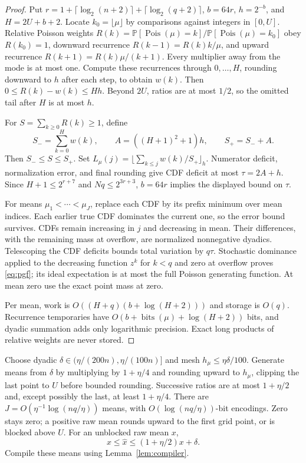 \documentclass[acmsmall,11pt,screen,nonacm]{acmart}
\newcommand{\Pois}{\operatorname{Pois}}
\newcommand{\Prb}{\mathbb{P}}
\newcommand{\floorg}[2]{\lfloor #1\rfloor_{#2}}
\begin{document}
\begin{proof}
Put $r=1+\lceil\log_2(n+2)\rceil+\lceil\log_2(q+2)\rceil$, $b=64r$, $h=2^{-b}$, and $H=2U+b+2$. Locate $k_0=\lfloor\mu\rfloor$ by comparisons against integers in $[0,U]$. Relative Poisson weights $R(k)=\Prb[\Pois(\mu)=k]/\Prb[\Pois(\mu)=k_0]$ obey $R(k_0)=1$, downward recurrence $R(k-1)=R(k)k/\mu$, and upward recurrence $R(k+1)=R(k)\mu/(k+1)$. Every multiplier away from the mode is at most one. Compute these recurrences through $0,\ldots,H$, rounding downward to $h$ after each step, to obtain $w(k)$. Then $0\le R(k)-w(k)\le Hh$. Beyond $2U$, ratios are at most $1/2$, so the omitted tail after $H$ is at most $h$.

For $S=\sum_{k\ge0}R(k)\ge1$, define
\[
 S_-=\sum_{k=0}^Hw(k),\qquad A=((H+1)^2+1)h,\qquad S_+=S_-+A.
\]
Then $S_-\le S\le S_+$. Set $L_\mu(j)=\floorg{\sum_{k\le j}w(k)/S_+}{h}$. Numerator deficit, normalization error, and final rounding give CDF deficit at most $\tau=2A+h$. Since $H+1\le2^{r+7}$ and $Nq\le2^{3r+3}$, $b=64r$ implies the displayed bound on $\tau$.

For means $\mu_1<\cdots<\mu_J$, replace each CDF by its prefix minimum over mean indices. Each earlier true CDF dominates the current one, so the error bound survives. CDFs remain increasing in $j$ and decreasing in mean. Their differences, with the remaining mass at overflow, are normalized nonnegative dyadics. Telescoping the CDF deficits bounds total variation by $q\tau$. Stochastic dominance applied to the decreasing function $z^k$ for $k<q$ and zero at overflow proves \eqref{eq:pgf}; its ideal expectation is at most the full Poisson generating function. At mean zero use the exact point mass at zero.

Per mean, work is $O((H+q)(b+\log(H+2)))$ and storage is $O(q)$. Recurrence temporaries have $O(b+\operatorname{bits}(\mu)+\log(H+2))$ bits, and dyadic summation adds only logarithmic precision. Exact long products of relative weights are never stored.
\end{proof}

Choose dyadic $\delta\in(\eta/(200n),\eta/(100n)]$ and mesh $h_\mu\le\eta\delta/100$. Generate means from $\delta$ by multiplying by $1+\eta/4$ and rounding upward to $h_\mu$, clipping the last point to $U$ before bounded rounding. Successive ratios are at most $1+\eta/2$ and, except possibly the last, at least $1+\eta/4$. There are $J=O(\eta^{-1}\log(nq/\eta))$ means, with $O(\log(nq/\eta))$-bit encodings. Zero stays zero; a positive raw mean rounds upward to the first grid point, or is blocked above $U$. For an unblocked raw mean $x$,
\begin{equation}\label{eq:mean}
 x\le\widehat x\le(1+\eta/2)x+\delta.
\end{equation}
Compile these means using Lemma~\ref{lem:compiler}.
\end{document}
